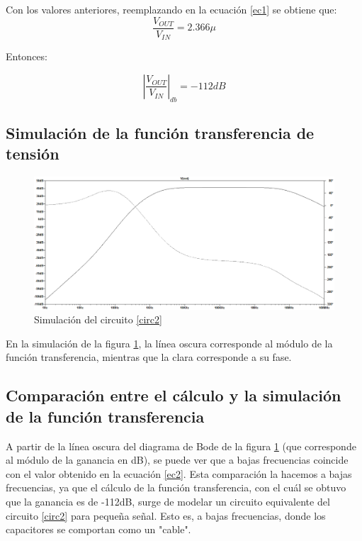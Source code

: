 Con los valores anteriores, reemplazando en la ecuaci\'on \ref{ec1} se obtiene que:
$$ \frac{V_{OUT}}{V_{IN}} = 2.366\mu $$

Entonces:

\begin{equation} |\frac{V_{OUT}}{V_{IN}} |_{db} = -112 dB \label{ec2} \end{equation}

\subsection*{\color{orange} Simulaci\'on de la funci\'on transferencia de tensi\'on}


\begin{figure}[H] %
\centering
\includegraphics[scale=0.45]{../EJ2/rtaenfrec}
\caption{Simulaci\'on del circuito \ref{circ2}}
\label{simEj2}
\end{figure}

En la simulaci\'on de la figura \ref{simEj2}, la l\'inea oscura corresponde al m\'odulo de la funci\'on transferencia, mientras que la clara corresponde a su fase. 

\subsection*{\color{orange} Comparaci\'on entre el c\'alculo y la simulaci\'on de la funci\'on transferencia}

A partir de la l\'inea oscura del diagrama de Bode de la figura \ref{simEj2} (que corresponde al m\'odulo de la ganancia en dB), se puede ver que a bajas frecuencias coincide con  el valor obtenido en la ecuaci\'on \ref{ec2}. Esta comparaci\'on la hacemos a bajas frecuencias, ya que el c\'alculo de la funci\'on transferencia, con el cu\'al se obtuvo que la ganancia es de -112dB, surge de modelar un circuito equivalente del circuito \ref{circ2} para pequeña señal. Esto es, a bajas frecuencias, donde los capacitores se comportan como un "cable".





















